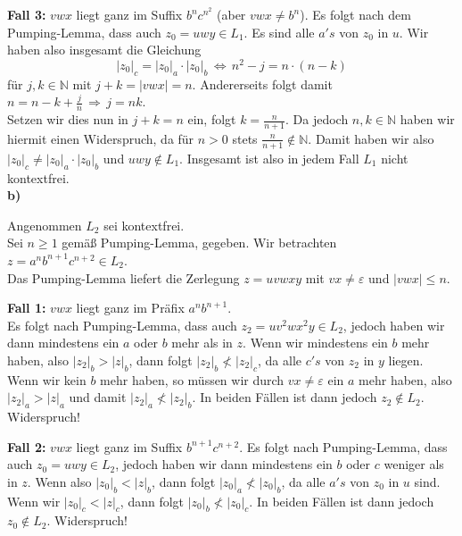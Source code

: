 \documentclass[a4paper,graphics,11pt]{article}
\begin{document}
\textbf{Fall 3:} $vwx$ liegt ganz im Suffix $b^nc^{n^2}$ (aber $vwx \neq b^n$).
Es folgt nach dem Pumping-Lemma, dass auch $z_0 = uwy \in L_1$. Es sind
alle $a's$ von $z_0$ in $u$. Wir haben also insgesamt die Gleichung
$$
    |z_0|_c = |z_0|_a \cdot |z_0|_b
    \,\Longleftrightarrow\, n^2-j = n\cdot(n-k)
$$
für $j,k \in \mathbb{N}$ mit $j+k = |vwx| = n$. Andererseits folgt damit
$
    n = n-k+\frac{j}{n} \,\Longrightarrow\, j=nk
$.\\
Setzen wir dies nun in $j+k = n$ ein, folgt $k = \frac{n}{n+1}$. Da jedoch
$n,k \in \mathbb{N}$ haben wir hiermit einen Widerspruch, da für $n > 0$ stets
$\frac{n}{n+1} \notin \mathbb{N}$. Damit haben wir also $|z_0|_c \neq |z_0|_a \cdot |z_0|_b$ und $uwy \notin L_1$. Insgesamt ist also in jedem Fall $L_1$ nicht kontextfrei.\\


\textbf{b)}

Angenommen $L_2$ sei kontextfrei.\\
Sei $n\geq 1$ gemäß Pumping-Lemma, gegeben.
Wir betrachten $z = a^nb^{n+1}c^{n+2} \in L_2$.\\
Das Pumping-Lemma liefert die Zerlegung $z = uvwxy$ mit $vx \neq \varepsilon$ und
$|vwx| \leq n$.

\textbf{Fall 1:} $vwx$ liegt ganz im Präfix $a^nb^{n+1}$.\\
Es folgt nach Pumping-Lemma, dass auch $z_2 = uv^2wx^2y \in L_2$, jedoch haben wir
dann mindestens ein $a$ oder $b$ mehr als in $z$. Wenn wir mindestens ein $b$ mehr
haben, also $|z_2|_b > |z|_b$, dann folgt $|z_2|_b \not< |z_2|_c$, da alle
$c's$ von $z_2$ in $y$ liegen. Wenn wir kein $b$ mehr haben, so müssen wir durch
$vx \neq \varepsilon$ ein $a$ mehr haben, also $|z_2|_a > |z|_a$ und damit $|z_2|_a \not< |z_2|_b$. In beiden Fällen ist dann jedoch $z_2 \notin L_2$. Widerspruch!

\textbf{Fall 2:} $vwx$ liegt ganz im Suffix $b^{n+1}c^{n+2}$.
Es folgt nach Pumping-Lemma, dass auch $z_0 = uwy \in L_2$, jedoch haben wir dann
mindestens ein $b$ oder $c$ weniger als in $z$. Wenn also $|z_0|_b < |z|_b$, dann
folgt $|z_0|_a \not< |z_0|_b$, da alle $a's$ von $z_0$ in $u$ sind.
Wenn wir $|z_0|_c < |z|_c$, dann folgt $|z_0|_b \not< |z_0|_c$.
In beiden Fällen ist dann jedoch $z_0 \notin L_2$. Widerspruch!
\end{document}
